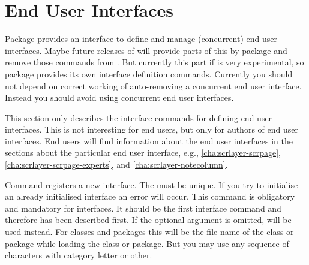 \section{End User Interfaces}

Package  provides an interface to define and manage
(concurrent) end user interfaces. Maybe future releases of \KOMAScript{} will
provide parts of this by package  and remove those commands
from . But currently this part if  is very
experimental, so package  provides its own interface
definition commands. Currently you should not depend on correct working of
auto-removing a concurrent end user interface. Instead you should avoid using
concurrent end user interfaces.

This section only describes the interface commands for defining end user
interfaces. This is not interesting for end users, but only for authors of end
user interfaces. End users will find information about the end user interfaces
in the sections about the particular end user interface, e.g.,
\autoref{cha:scrlayer-scrpage}, \autoref{cha:scrlayer-scrpage-experts}, and
\autoref{cha:scrlayer-notecolumn}.

\begin{Declaration}
\end{Declaration}
%
Command 
registers a new interface. The  must be unique. If you
try to initialise an already initialised interface an error will occur. This
command is obligatory and mandatory for interfaces. It should be the first
interface command and therefore has been described first. If the optional
argument is omitted,  will be
used instead. For classes and packages this will be the file name of the class
or package while loading the class or package. But you may use any sequence of
characters with category letter or other.%

